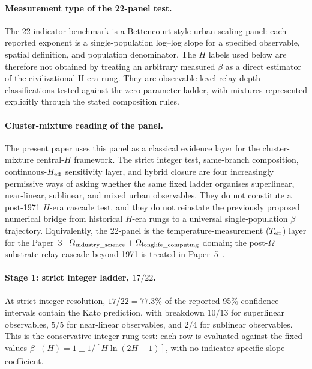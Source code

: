 \paragraph{Measurement type of the 22-panel test.}
The 22-indicator benchmark is a Bettencourt-style urban scaling panel: each reported exponent is a single-population log--log slope for a specified observable, spatial definition, and population denominator. The \(H\) labels used below are therefore not obtained by treating an arbitrary measured \(\beta\) as a direct estimator of the civilizational H-era rung. They are observable-level relay-depth classifications tested against the zero-parameter ladder, with mixtures represented explicitly through the stated composition rules.

\paragraph{Cluster-mixture reading of the panel.}
The present paper uses this panel as a classical evidence layer for the cluster-mixture central-\(H\) framework. The strict integer test, same-branch composition, continuous-\(H_{\mathrm{eff}}\) sensitivity layer, and hybrid closure are four increasingly permissive ways of asking whether the same fixed ladder organises superlinear, near-linear, sublinear, and mixed urban observables. They do not constitute a post-1971 \(H\)-era cascade test, and they do not reinstate the previously proposed numerical bridge from historical \(H\)-era rungs to a universal single-population \(\beta\) trajectory. Equivalently, the 22-panel is the temperature-measurement (\(T_{\rm eff}\)) layer for the Paper~3~\cite{Kato2026c} \(\Omega_{\rm industry\_science}+\Omega_{\rm longlife\_computing}\) domain; the post-\(\Omega\) substrate-relay cascade beyond 1971 is treated in Paper~5~\cite{Kato2026e}.

\paragraph{Stage 1: strict integer ladder, \(17/22\).}
At strict integer resolution, \(17/22=77.3\%\) of the reported 95\%
confidence intervals contain the Kato prediction, with breakdown \(10/13\)
for superlinear observables, \(5/5\) for near-linear observables, and \(2/4\)
for sublinear observables. This is the conservative integer-rung test:
each row is evaluated against the fixed values
\(\beta_{\pm}(H)=1\pm1/[H\ln(2H+1)]\), with no indicator-specific slope
coefficient.

